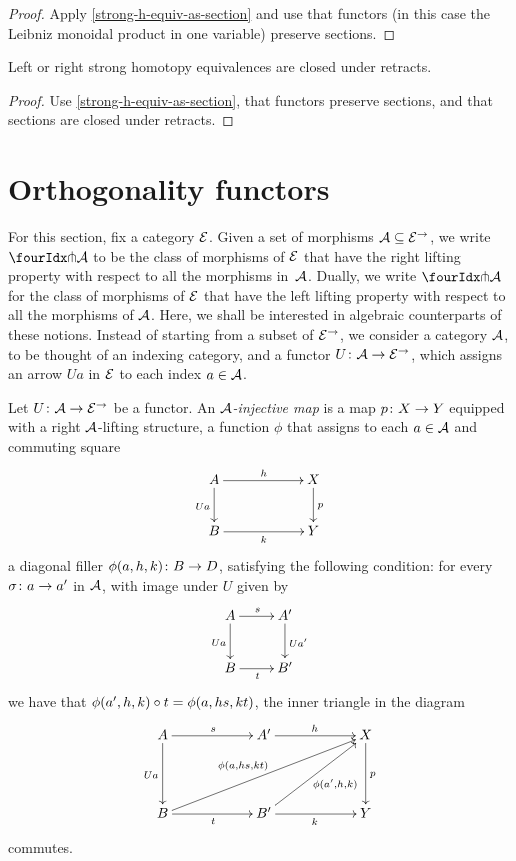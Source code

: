 \documentclass[reqno,10pt,a4paper,oneside]{amsart}
\begin{document}
\begin{proof}
Apply \cref{strong-h-equiv-as-section} and use that functors (in this case the Leibniz monoidal product in one variable) preserve sections.
\end{proof}

\begin{proposition}
\label{strong-h-equiv-closed-under-retract}
Left or right strong homotopy equivalences are closed under retracts.
\end{proposition}

\begin{proof}
Use \cref{strong-h-equiv-as-section},  that functors preserve sections, and that  sections are closed under retracts.
\end{proof}



\section{Orthogonality functors}
\label{sec:ortf}

For this section, fix a category $\catE$. Given a set of morphisms $\cal{A} \subseteq \catE^\to$, we 
write $\liftr{\cal{A}}$ to be the class of morphisms of $\catE$ that have 
the right lifting property with respect to all the morphisms in~$\cal{A}$. Dually, we write $\liftl{\cal{A}}$ for the class of morphisms of $\catE$ that have the left lifting property with respect to all the morphisms of $\cal{A}$. 
Here, we shall be interested in algebraic counterparts of these notions. Instead of starting from a subset of $\catE^\to$, we consider a category $\cal{A}$, to be thought of an indexing category, and a functor $U \co \cal{A} \to \catE^\to$, which assigns an arrow $U a$ in $\catE$ to each index $a \in \cal{A}$.


 \begin{definition} Let $U \co \cal{A} \to \catE^\to$ be a functor. An \emph{$\cal{A}$-injective map}
 is a map $p \co X \to Y$ equipped with a right  $\cal{A}$-lifting structure, \ie 
 a function  $\phi$ that assigns to each $a \in \cal{A}$ and commuting square
\[
\xymatrix@C=2cm{
A \ar[r]^{h}   \ar[d]_{U a} & X \ar[d]^p \\
B \ar[r]_{k} & Y}
\]
a diagonal filler $\phi(a, h, k) \co B \to D$, satisfying the following condition: for every $\sigma \co a \to a'$ in $\cal{A}$, 
with image under $U$ given by
\[
\xymatrix{
A \ar[r]^s \ar[d]_{Ua} & A' \ar[d]^{U a'}  \\
B \ar[r]_{t} & B'}
\]
we have that $\phi(a', h, k) \cc t = \phi(a, hs, kt)$, \ie the inner triangle in the diagram
\[
\xymatrix@C=2cm@R=1.5cm{
A \ar[r]^s \ar[d]_{Ua} & A' \ar[r]^{h}  & X \ar[d]^p   \\
B \ar[r]_{t}  \ar[urr]^{\phi(a, hs, k t) \quad } & B'  \ar[r]_k  \ar[ur]_{\phi(a', h, k)} & Y }
\]
commutes. 
\end{definition}
\end{document}
